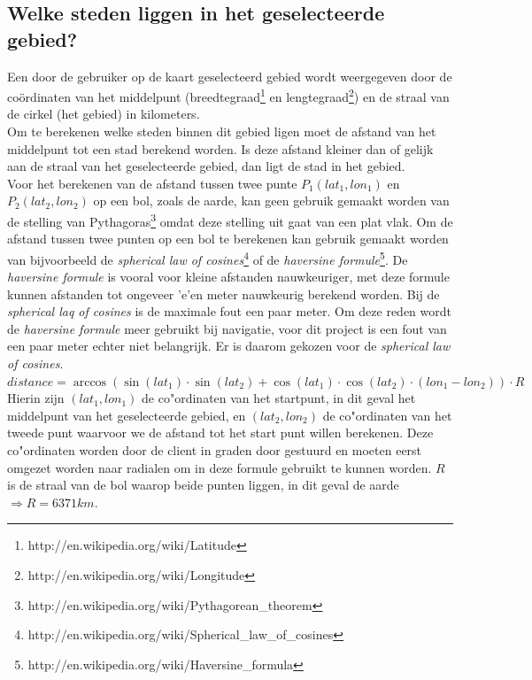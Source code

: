 \documentclass[twoside,openright]{uva-bachelor-thesis}
\begin{document}
		\subsection{Welke steden liggen in het geselecteerde gebied?}
		Een door de gebruiker op de kaart geselecteerd gebied wordt weergegeven door de co\"ordinaten van het middelpunt (breedtegraad\footnote{http://en.wikipedia.org/wiki/Latitude} en lengtegraad\footnote{http://en.wikipedia.org/wiki/Longitude}) en de straal van de cirkel (het gebied) in kilometers.
		\\[0.5cm]
		Om te berekenen welke steden binnen dit gebied ligen moet de afstand van het middelpunt tot een stad berekend worden. Is deze afstand kleiner dan of gelijk aan de straal van het geselecteerde gebied, dan ligt de stad in het gebied.
		\\[0.5cm]
		Voor het berekenen van de afstand tussen twee punte $P_1(lat_1, lon_1)$ en $P_2(lat_2, lon_2)$ op een bol, zoals de aarde,  kan geen gebruik gemaakt worden van de stelling van Pythagoras\footnote{http://en.wikipedia.org/wiki/Pythagorean\_theorem} omdat deze stelling uit gaat van een plat vlak. Om de afstand tussen twee punten op een bol te berekenen kan gebruik gemaakt worden van bijvoorbeeld de \textit{spherical law of cosines}\footnote{http://en.wikipedia.org/wiki/Spherical\_law\_of\_cosines} of de \textit{haversine formule}\footnote{http://en.wikipedia.org/wiki/Haversine\_formula}. De \textit{haversine formule} is vooral voor kleine afstanden nauwkeuriger, met deze formule kunnen afstanden tot ongeveer 'e'en meter nauwkeurig berekend worden. Bij de \textit{spherical laq of cosines} is de maximale fout een paar meter. Om deze reden wordt de \textit{haversine formule} meer gebruikt bij navigatie, voor dit project is een fout van een paar meter echter niet belangrijk. Er is daarom gekozen voor de \textit{spherical law of cosines}.
		\\[0.5cm]
		$distance = \arccos(\sin(lat_1) \cdot \sin(lat_2) + \cos(lat_1) \cdot \cos(lat_2) \cdot(lon_1 - lon_2)) \cdot R$
		\\[0.5cm]
		Hierin zijn $(lat_1, lon_1)$ de co"ordinaten van het startpunt, in dit geval het middelpunt van het geselecteerde gebied, en $(lat_2, lon_2)$ de co"ordinaten van het tweede punt waarvoor we de afstand tot het start punt willen berekenen. Deze co"ordinaten worden door de client in graden door gestuurd en moeten eerst omgezet worden naar radialen om in deze formule gebruikt te kunnen worden. $R$ is de straal van de bol waarop beide punten liggen, in dit geval de aarde $ 	\Rightarrow R = 6371km$.
\end{document}

